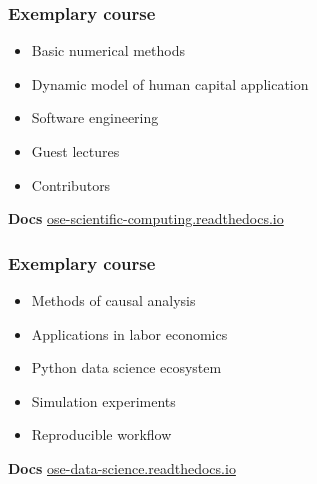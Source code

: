 \begin{frame}\frametitle{Exemplary course}

	\vspace{0.25cm}\vspace{0.3cm}

	\begin{itemize}\setlength\itemsep{1em}
\item Basic numerical methods
\item Dynamic model of human capital application
\item Software engineering
\item Guest lectures
\item Contributors
\end{itemize}

\textbf{Docs}\hspace{0.25cm} \url{ose-scientific-computing.readthedocs.io}

\end{frame}
\begin{frame}\frametitle{Exemplary course}

	\vspace{0.25cm}\vspace{0.3cm}

	\begin{itemize}\setlength\itemsep{1em}
\item Methods of causal analysis
\item Applications in labor economics
\item Python data science ecosystem
\item Simulation experiments
\item Reproducible workflow
\end{itemize}

\textbf{Docs}\hspace{0.25cm} \url{ose-data-science.readthedocs.io}

\end{frame}
